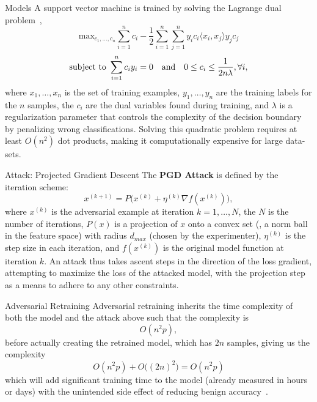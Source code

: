 \documentclass{beamer}
\begin{document}
\begin{frame}{Models}
    A support vector machine is trained by solving the Lagrange dual problem~\cite{cortes1995support},
\begin{equation}
    \textrm{max}_{c_1,\ldots,c_n}
    \sum_{i = 1}^n c_i - \frac{1}{2} \sum_{i = 1}^n \sum_{j = 1}^n y_i c_i \langle x_i, x_j \rangle y_j c_j
    \label{eq:linear_svm}
\end{equation}
$$
    \textrm{subject to } \sum_{i = 1}^n c_i y_i = 0 \textrm{\quad and\quad} 0 \leq c_i \leq \frac{1}{2n\lambda}, \forall i,
$$
where $x_1,\ldots,x_n$ is the set of training examples, $y_1,\ldots,y_n$ are the training labels for the $n$ samples, the $c_i$ are the dual variables found during training, and $\lambda$ is a regularization parameter that controls the complexity of the decision boundary by penalizing wrong classifications. Solving this quadratic problem requires at least $O(n^2)$ dot products, making it computationally expensive for large data-sets.
\end{frame}

\begin{frame}{Attack: Projected Gradient Descent}
The \textbf{PGD Attack} is defined by the iteration scheme:
$$
    x^{(k+1)} = P\big(x^{(k)} + \eta^{(k)} \nabla f(x^{(k)})\big),
$$
where $x^{(k)}$ is the adversarial example at iteration $k = 1,\ldots,N$, the $N$ is the number of iterations, $P(x)$ is a projection of $x$ onto a convex set (, a norm ball in the feature space) with radius $d_{max}$ (chosen by the experimenter), $\eta^{(k)}$ is the step size in each iteration, and $f(x^{(k)})$ is the original model function at iteration $k$. An attack thus takes ascent steps in the direction of the loss gradient, attempting to maximize the loss of the attacked model, with the projection step as a means to adhere to any other constraints.
\end{frame}

\begin{frame}{Adversarial Retraining}
    Adversarial retraining inherits the time complexity of both the model and the attack above such that the complexity is
$$
    O(n^2p),
$$
before actually creating the retrained model, which has $2n$ samples, giving us the complexity
$$
    O(n^2p) + O\big((2n)^2\big) = O(n^2p)
$$
which will add significant training time to the model (already measured in hours or days) with the unintended side effect of reducing benign accuracy~\cite{stutz2019confidence}.
\end{frame}
\end{document}
